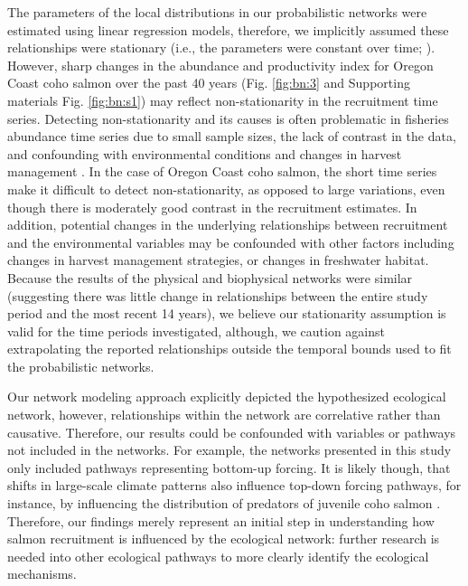The parameters of the local distributions in our probabilistic networks were
estimated using linear regression models, therefore, we implicitly assumed these
relationships were stationary (i.e., the parameters were constant over time;
\citealp{Walters1987a}). However, sharp changes in the abundance and productivity
index for Oregon Coast coho salmon over the past 40 years (Fig. \ref{fig:bn:3}
and Supporting materials Fig. \ref{fig:bn:s1}) may reflect non-stationarity in
the recruitment time series. Detecting non-stationarity and its causes is often
problematic in fisheries abundance time series due to small sample sizes, the
lack of contrast in the data, and confounding with environmental conditions and
changes in harvest management \citep{Walters1987a, Peterman2009a}. In the case
of Oregon Coast coho salmon, the short time series make it difficult to detect
non-stationarity, as opposed to large variations, even though there is
moderately good contrast in the recruitment estimates. In addition, potential
changes in the underlying relationships between recruitment and the
environmental variables may be confounded with other factors including changes
in harvest management strategies, or changes in freshwater habitat. Because the
results of the physical and biophysical networks were similar (suggesting there
was little change in relationships between the entire study period and the most
recent 14 years), we believe our stationarity assumption is valid for the time
periods investigated, although, we caution against extrapolating the reported
relationships outside the temporal bounds used to fit the probabilistic
networks.

Our network modeling approach explicitly depicted the hypothesized ecological
network, however, relationships within the network are correlative rather than
causative. Therefore, our results could be confounded with variables or pathways
not included in the networks. For example, the networks presented in this study
only included pathways representing bottom-up forcing. It is likely though, that
shifts in large-scale climate patterns also influence top-down forcing pathways,
for instance, by influencing the distribution of predators of juvenile coho
salmon \citep{Pearcy2002a, Perry2005a}. Therefore, our findings merely represent
an initial step in understanding how salmon recruitment is influenced by the
ecological network: further research is needed into other ecological pathways to
more clearly identify the ecological mechanisms.

